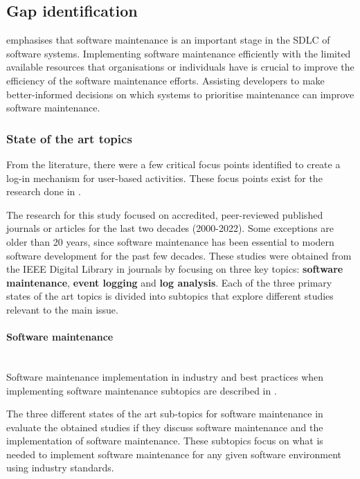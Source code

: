 \newcommand{\studyGap}{Implementing software maintenance efficiently with the limited available resources that organisations or individuals have is crucial to improve the efficiency of the software maintenance efforts. Assisting developers to make better-informed decisions on which systems to prioritise maintenance can improve software maintenance.}

\subsection{Gap identification}\label{sec:ch1_gapIdentification}
 emphasises that software maintenance is an important stage in the SDLC of software systems. \studyGap

\subsubsection{State of the art topics}
From the literature, there were a few critical focus points identified to create a log-in mechanism for user-based activities. These focus points exist for the research done in .\par The research for this study focused on accredited, peer-reviewed published journals or articles for the last two decades (2000-2022). Some exceptions are older than 20 years, since software maintenance has been essential to modern software development for the past few decades. These studies were obtained from the IEEE Digital Library in journals by focusing on three key topics: \textbf{software maintenance}, \textbf{event logging} and \textbf{log analysis}. Each of the three primary states of the art topics is divided into subtopics that explore different studies relevant to the main issue.

\paragraph{Software maintenance} \leavevmode\\
Software maintenance implementation in industry and best practices when implementing software maintenance subtopics are described in .\par The three different states of the art sub-topics for software maintenance in  evaluate the obtained studies if they discuss software maintenance and the implementation of software maintenance. These subtopics focus on what is needed to implement software maintenance for any given software environment using industry standards.

